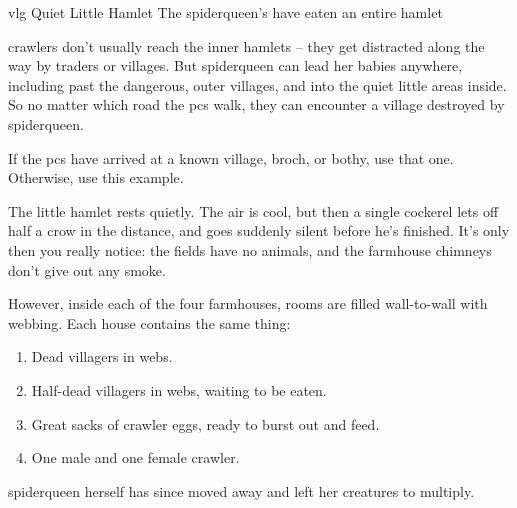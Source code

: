 \spiderqueen
\label{spiderqueen}



{\gls{vlg} Quiet Little Hamlet}%
{The \gls{spiderqueen}'s  have eaten an entire hamlet}%

\Glspl{crawler} don't usually reach the inner hamlets -- they get distracted along the way by traders or \glspl{village}.
But \gls{spiderqueen} can lead her babies anywhere, including past the dangerous, outer \glspl{village}, and into the quiet little areas inside.
So no matter which road the \glspl{pc} walk, they can encounter a village destroyed by \gls{spiderqueen}.

If the \glspl{pc} have arrived at a known \gls{village}, \gls{broch}, or \gls{bothy}, use that one.
Otherwise, use this example.

\begin{boxtext}
  The little hamlet rests quietly.
  The air is cool, but then a single cockerel lets off half a crow in the distance, and goes suddenly silent before he's finished.
  It's only then you really notice: the fields have no animals, and the farmhouse chimneys don't give out any smoke.
\end{boxtext}

However, inside each of the four farmhouses, rooms are filled wall-to-wall with webbing.  Each house contains the same thing:

\begin{enumerate}
  \item
  Dead villagers in webs.
  \item
  Half-dead villagers in webs, waiting to be eaten.
  \item
  Great sacks of \gls{crawler} eggs, ready to burst out and feed.
  \item
    One male and one female \gls{crawler}.
\end{enumerate}

\Gls{spiderqueen} herself has since moved away and left her creatures to multiply.

